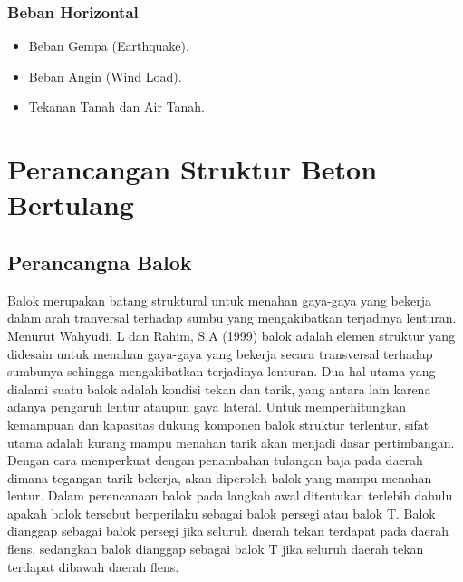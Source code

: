 \documentclass[../modul_skb.tex]{subfiles}
\begin{document}
\subsubsection{Beban Horizontal}%
\label{ssub:Beban Horizontal}

\begin{itemize}\item Beban Gempa (Earthquake).
	\item Beban Angin (Wind Load).
	\item Tekanan Tanah dan Air Tanah.

\end{itemize}


\section{Perancangan Struktur Beton Bertulang}%
\label{sec:Perancangan Struktur Beton Bertulang}

\subsection{Perancangna Balok}%
\label{sub:Perancangna Balok}

Balok merupakan batang struktural untuk menahan gaya-gaya yang bekerja dalam arah tranversal terhadap sumbu yang mengakibatkan terjadinya lenturan. Menurut Wahyudi, L dan Rahim, S.A (1999) balok adalah elemen struktur yang didesain untuk menahan gaya-gaya yang bekerja secara transversal terhadap sumbunya sehingga mengakibatkan terjadinya lenturan. Dua hal utama yang dialami suatu balok adalah kondisi tekan dan tarik, yang antara lain karena adanya pengaruh lentur ataupun gaya lateral.
Untuk memperhitungkan kemampuan dan kapasitas dukung komponen balok struktur terlentur, sifat utama adalah kurang mampu menahan tarik akan menjadi dasar pertimbangan. Dengan cara memperkuat dengan penambahan tulangan baja pada daerah dimana tegangan tarik bekerja, akan diperoleh balok yang mampu menahan lentur.
Dalam perencanaan balok pada langkah awal ditentukan terlebih dahulu apakah balok tersebut berperilaku sebagai balok persegi atau balok T. Balok dianggap sebagai balok persegi jika seluruh daerah tekan terdapat pada daerah flens, sedangkan balok dianggap sebagai balok T jika seluruh daerah tekan terdapat dibawah daerah flens.










\end{document}
